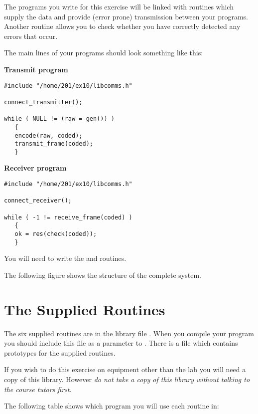 \documentclass[a4paper,10pt]{article}
\begin{document}
The programs you write for this exercise will be linked with routines which
supply the data and provide (error prone) transmission between your
programs.  Another routine allows you to check whether you have correctly
detected any errors that occur.

\newpage
The main lines of your programs should look something like this:

{\bf Transmit program}

\begin{verbatim}
#include "/home/201/ex10/libcomms.h"

connect_transmitter();

while ( NULL != (raw = gen()) )
   {
   encode(raw, coded);
   transmit_frame(coded);
   }
\end{verbatim}

{\bf Receiver program}

\begin{verbatim}
#include "/home/201/ex10/libcomms.h"

connect_receiver();

while ( -1 != receive_frame(coded) )
   {
   ok = res(check(coded));
   }	
\end{verbatim}

You will need to write the  and  routines.

The following figure shows the structure of the complete system.

\begin{center}
\end{center}

\newpage
\section{The Supplied Routines}

The six supplied routines are in the library file
.  When you compile your program you
should include this file as a parameter to .  There is a
 file which contains prototypes for the
supplied routines.

If you wish to do this exercise on equipment other than the lab you
will need a copy of this library.  However {\em do not take a copy of
this library without talking to the course tutors first.}

The following table shows which program you will use each routine in:
\vspace{1cm}
\end{document}
